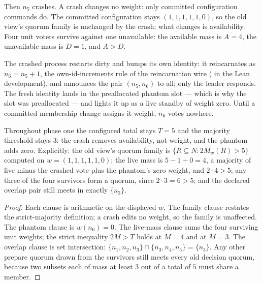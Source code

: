 Then $n_5$ crashes. A crash changes no weight: only committed configuration
commands do. The committed configuration stays $(1,1,1,1,1,0)$, so the old
view's quorum family is unchanged by the crash; what changes is availability.
Four unit voters survive against one unavailable: the available mass is $A=4$,
the unavailable mass is $D=1$, and $A>D$.

The crashed process restarts dirty and bumps its own identity: it reincarnates
as $n_6=n_5{+}1$, the own-id-increments rule of the reincarnation wire
( in the Lean development), and announces the pair
$(n_5,n_6)$ to all; only the leader responds. The fresh identity lands in the
preallocated phantom slot --- which is why the slot was preallocated --- and
lights it up as a live standby of weight zero. Until a committed membership
change assigns it weight, $n_6$ votes nowhere.

\begin{proposition}\label{prop:phantom}
Throughout phase one the configured total stays $T=5$ and the majority
threshold stays $3$: the crash removes availability, not weight, and the
phantom adds zero. Explicitly: the old view's quorum family is
$\{R\subseteq N:2M_w(R)>5\}$ computed on $w=(1,1,1,1,1,0)$; the live mass is
$5-1+0=4$, a majority of five minus the crashed vote plus the phantom's zero
weight, and $2\cdot4>5$; any three of the four survivors form a quorum, since
$2\cdot3=6>5$; and the declared overlap pair still meets in exactly
$\{n_3\}$.
\end{proposition}
\begin{proof}
Each clause is arithmetic on the displayed $w$. The family clause restates the
strict-majority definition; a crash edits no weight, so the family is
unaffected. The phantom clause is $w(n_6)=0$. The live-mass clause sums the
four surviving unit weights; the strict inequality $2M>T$ holds at $M=4$ and at
$M=3$. The overlap clause is set intersection:
$\{n_1,n_2,n_3\}\cap\{n_3,n_4,n_5\}=\{n_3\}$. Any other prepare quorum drawn
from the survivors still meets every old decision quorum, because two subsets
each of mass at least $3$ out of a total of $5$ must share a member.
\end{proof}

